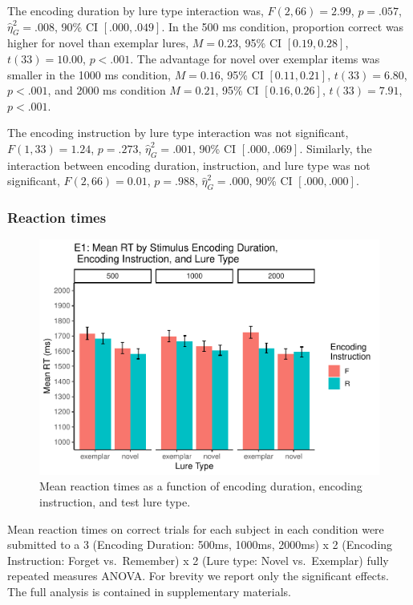 \documentclass[
  english,
  man,floatsintext]{apa6}
\begin{document}
The encoding duration by lure type interaction was, \(F(2, 66) = 2.99\), \(p = .057\), \(\hat{\eta}^2_G = .008\), 90\% CI \([.000, .049]\). In the 500 ms condition, proportion correct was higher for novel than exemplar lures, \(M = 0.23\), 95\% CI \([0.19, 0.28]\), \(t(33) = 10.00\), \(p < .001\). The advantage for novel over exemplar items was smaller in the 1000 ms condition, \(M = 0.16\), 95\% CI \([0.11, 0.21]\), \(t(33) = 6.80\), \(p < .001\), and 2000 ms condition \(M = 0.21\), 95\% CI \([0.16, 0.26]\), \(t(33) = 7.91\), \(p < .001\).

The encoding instruction by lure type interaction was not significant, \(F(1, 33) = 1.24\), \(p = .273\), \(\hat{\eta}^2_G = .001\), 90\% CI \([.000, .069]\). Similarly, the interaction between encoding duration, instruction, and lure type was not significant, \(F(2, 66) = 0.01\), \(p = .988\), \(\hat{\eta}^2_G = .000\), 90\% CI \([.000, .000]\).

\hypertarget{reaction-times}{%
\subsubsection{Reaction times}\label{reaction-times}}

\begin{figure}
\centering
\includegraphics{honorsThesis_NEW_files/figure-latex/E1fig2-1.pdf}
\caption{\label{fig:E1fig2}Mean reaction times as a function of encoding duration, encoding instruction, and test lure type.}
\end{figure}

Mean reaction times on correct trials for each subject in each condition were submitted to a 3 (Encoding Duration: 500ms, 1000ms, 2000ms) x 2 (Encoding Instruction: Forget vs.~Remember) x 2 (Lure type: Novel vs.~Exemplar) fully repeated measures ANOVA. For brevity we report only the significant effects. The full analysis is contained in supplementary materials.
\end{document}

